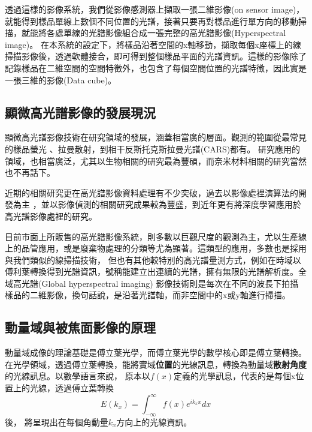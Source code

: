 \documentclass[12pt]{article}
\begin{document}
透過這樣的影像系統，我們從影像感測器上擷取一張二維影像(on sensor image)，就能得到樣品單線上數個不同位置的光譜，接著只要再對樣品進行單方向的移動掃描，就能將各處單線的光譜影像組合成一張完整的高光譜影像(Hyperspectral image)。
在本系統的設定下，將樣品沿著空間的x軸移動，擷取每個x座標上的線掃描影像後，透過軟體接合，即可得到整個樣品平面的光譜資訊。這樣的影像除了記錄樣品在二維空間的空間特徵外，也包含了每個空間位置的光譜特徵，因此實是一張三維的影像(Data cube)。

\subsection{顯微高光譜影像的發展現況}
顯微高光譜影像技術在研究領域的發展，涵蓋相當廣的層面。觀測的範圍從最常見的樣品螢光
、拉曼散射，到相干反斯托克斯拉曼光譜(CARS)都有\cite{roth2015hyperspectral,zhang2013quantitative, pegoraro2014hyperspectral}。
研究應用的領域，也相當廣泛，尤其以生物相關的研究最為豐碩\cite{leavesley2012hyperspectral,studer2012compressive}，而奈米材料相關的研究當然也不再話下\cite{roth2015hyperspectral}。

近期的相關研究更在高光譜影像資料處理有不少突破，過去以影像處裡演算法的開發為主
\cite{manolakis2002detection,nascimento2005vertex}
，並以影像偵測的相關研究成果較為豐盛\cite{manolakis2009there}，到近年更有將深度學習應用於高光譜影像處裡的研究\cite{chen2014deep}。

目前市面上所販售的高光譜影像系統，則多數以巨觀尺度的觀測為主，尤以生產線上的品管應用，或是廢棄物處理的分類等尤為顯著\cite{useCaseInline}。這類型的應用，多數也是採用與我們類似的線掃描技術，
但也有其他較特別的高光譜量測方式，例如\cite{FTHY}在時域以傅利葉轉換得到光譜資訊，號稱能建立出連續的光譜，擁有無限的光譜解析度。全域高光譜(Global hyperspectral imaging)
影像技術則是每次在不同的波長下拍攝樣品的二維影像，換句話說，是沿著光譜軸，而非空間中的x或y軸進行掃描。\cite{globalHY}

\subsection{動量域與被焦面影像的原理}\label{sec: bfp}
動量域成像的理論基礎是傅立葉光學，而傅立葉光學的數學核心即是傅立葉轉換。在光學領域，透過傅立葉轉換，能將實域\textbf{位置}的光線訊息，轉換為動量域\textbf{散射角度}的光線訊息。以數學語言來說，
原本以\(f(x)\)定義的光學訊息，代表的是每個x位置上的光線，透過傅立葉轉換\[E(k_x)=\int_{-\infty}^{\infty}f(x)e^{ik_xx}dx\]後，
將呈現出在每個角動量\(k_x\)方向上的光線資訊。
\end{document}
